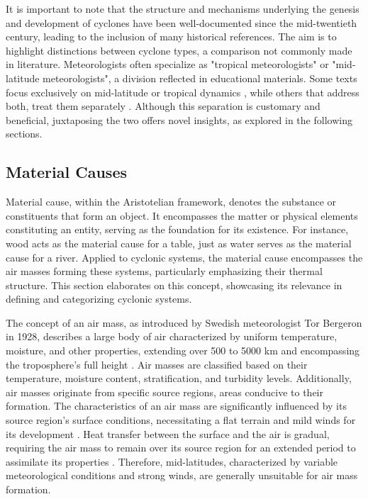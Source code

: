 It is important to note that the structure and mechanisms underlying the genesis and development of cyclones have been well-documented since the mid-twentieth century, leading to the inclusion of many historical references. The aim is to highlight distinctions between cyclone types, a comparison not commonly made in literature. Meteorologists often specialize as "tropical meteorologists" or "mid-latitude meteorologists", a division reflected in educational materials. Some texts focus exclusively on mid-latitude or tropical dynamics \citep[e.g.]{chan2010global,bluestein1992synoptic}, while others that address both, treat them separately \citep[e.g.]{holton1973introduction,donald2015meteorology}. Although this separation is customary and beneficial, juxtaposing the two offers novel insights, as explored in the following sections.


\subsection{Material Causes}\label{material_cause}

Material cause, within the Aristotelian framework, denotes the substance or constituents that form an object. It encompasses the matter or physical elements constituting an entity, serving as the foundation for its existence. For instance, wood acts as the material cause for a table, just as water serves as the material cause for a river. Applied to cyclonic systems, the material cause encompasses the air masses forming these systems, particularly emphasizing their thermal structure. This section elaborates on this concept, showcasing its relevance in defining and categorizing cyclonic systems.

The concept of an air mass, as introduced by Swedish meteorologist Tor Bergeron in 1928, describes a large body of air characterized by uniform temperature, moisture, and other properties, extending over 500 to 5000 km and encompassing the troposphere's full height \citep{stull2015practical}. Air masses are classified based on their temperature, moisture content, stratification, and turbidity levels. Additionally, air masses originate from specific source regions, areas conducive to their formation. The characteristics of an air mass are significantly influenced by its source region's surface conditions, necessitating a flat terrain and mild winds for its development \citep{donald2015meteorology}. Heat transfer between the surface and the air is gradual, requiring the air mass to remain over its source region for an extended period to assimilate its properties \citep{spiridonov2021fundamentals}. Therefore, mid-latitudes, characterized by variable meteorological conditions and strong winds, are generally unsuitable for air mass formation.

